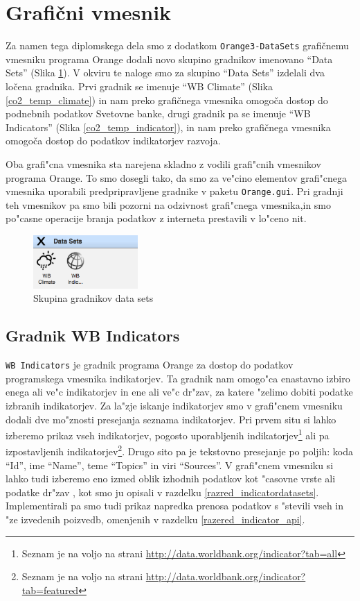 \section{Grafični vmesnik}

Za namen tega diplomskega dela smo z dodatkom \verb|Orange3-DataSets|
grafičnemu vmesniku programa Orange dodali novo skupino gradnikov imenovano
``Data Sets'' (Slika \ref{data_sets_group}). V okviru te naloge smo za skupino
``Data Sets'' izdelali dva ločena gradnika. Prvi gradnik se imenuje ``WB
Climate'' (Slika \ref{co2_temp_climate}) in nam preko grafičnega vmesnika 
omogoča dostop do podnebnih podatkov Svetovne banke, drugi gradnik pa se 
imenuje ``WB Indicators'' (Slika \ref{co2_temp_indicator}), in nam
preko grafičnega vmesnika omogoča dostop do podatkov indikatorjev razvoja.

Oba grafi"cna vmesnika sta narejena skladno z vodili grafi"cnih vmesnikov
programa Orange. To smo dosegli tako, da smo za ve"cino elementov grafi"cnega
vmesnika uporabili predpripravljene gradnike v paketu \verb|Orange.gui|. Pri
gradnji teh vmesnikov pa smo bili pozorni na odzivnost grafi"cnega vmesnika,in
smo po"casne operacije branja podatkov z interneta prestavili v lo"ceno nit.
 
\begin{figure}
  \begin{center}
    \includegraphics[width=4cm]{pic/data_sets_group.png}
  \end{center}
  \caption{Skupina gradnikov data sets}
  \label{data_sets_group}
\end{figure} 


\subsection{Gradnik WB Indicators}

\verb|WB Indicators| je gradnik programa Orange za dostop do podatkov
programskega vmesnika indikatorjev. Ta gradnik nam omogo"ca enastavno izbiro
enega ali ve"c indikatorjev in ene ali ve"c dr"zav, za katere "zelimo dobiti
podatke izbranih indikatorjev. Za la"zje iskanje indikatorjev smo v grafi"cnem
vmesniku dodali dve mo"znosti presejanja seznama indikatorjev. Pri prvem situ
si lahko izberemo prikaz vseh indikatorjev, pogosto uporabljenih 
indikatorjev\footnote{Seznam je na voljo na strani 
\url{http://data.worldbank.org/indicator?tab=all}}
ali pa izpostavljenih indikatorjev\footnote{Seznam je na voljo na strani 
\url{http://data.worldbank.org/indicator?tab=featured}}. Drugo sito pa je
tekstovno presejanje po poljih: koda ``Id'', ime ``Name'', teme ``Topics'' in
viri ``Sources''. 
V grafi"cnem vmesniku si lahko tudi izberemo eno izmed oblik izhodnih podatkov
kot "casovne vrste  ali podatke dr"zav , 
kot smo ju opisali v razdelku \ref{razred_indicatordatasets}. 
Implementirali pa smo tudi prikaz napredka prenosa podatkov s "stevili vseh in
"ze izvedenih poizvedb, omenjenih v razdelku \ref{razered_indicator_api}.


